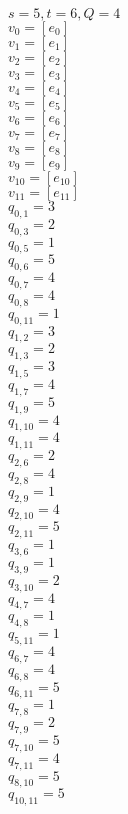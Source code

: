 \documentclass[a4paper,12pt]{article}
\begin{document}
\noindent
$s=5,t=6,Q=4$\\
$v_{0}=[e_{0}]$\\
$v_{1}=[e_{1}]$\\
$v_{2}=[e_{2}]$\\
$v_{3}=[e_{3}]$\\
$v_{4}=[e_{4}]$\\
$v_{5}=[e_{5}]$\\
$v_{6}=[e_{6}]$\\
$v_{7}=[e_{7}]$\\
$v_{8}=[e_{8}]$\\
$v_{9}=[e_{9}]$\\
$v_{10}=[e_{10}]$\\
$v_{11}=[e_{11}]$\\
$q_{0,1}=3$\\
$q_{0,3}=2$\\
$q_{0,5}=1$\\
$q_{0,6}=5$\\
$q_{0,7}=4$\\
$q_{0,8}=4$\\
$q_{0,11}=1$\\
$q_{1,2}=3$\\
$q_{1,3}=2$\\
$q_{1,5}=3$\\
$q_{1,7}=4$\\
$q_{1,9}=5$\\
$q_{1,10}=4$\\
$q_{1,11}=4$\\
$q_{2,6}=2$\\
$q_{2,8}=4$\\
$q_{2,9}=1$\\
$q_{2,10}=4$\\
$q_{2,11}=5$\\
$q_{3,6}=1$\\
$q_{3,9}=1$\\
$q_{3,10}=2$\\
$q_{4,7}=4$\\
$q_{4,8}=1$\\
$q_{5,11}=1$\\
$q_{6,7}=4$\\
$q_{6,8}=4$\\
$q_{6,11}=5$\\
$q_{7,8}=1$\\
$q_{7,9}=2$\\
$q_{7,10}=5$\\
$q_{7,11}=4$\\
$q_{8,10}=5$\\
$q_{10,11}=5$\\
\end{document}
